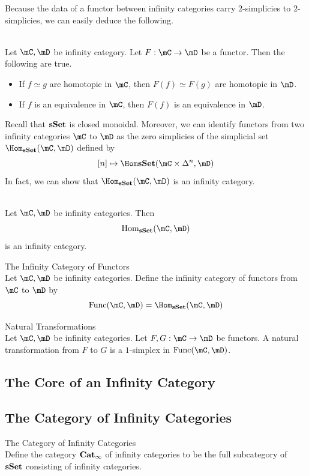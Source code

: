\documentclass[a4paper]{article}
\begin{document}
Because the data of a functor between infinity categories carry $2$-simplicies to $2$-simplicies, we can easily deduce the following. 

\begin{lmm}{}{}\\ Let $\mC,\mD$ be infinity category. Let $F:\mC\to\mD$ be a functor. Then the following are true. 
\begin{itemize}
\item If $f\simeq g$ are homotopic in $\mC$, then $F(f)\simeq F(g)$ are homotopic in $\mD$. 
\item If $f$ is an equivalence in $\mC$, then $F(f)$ is an equivalence in $\mD$. 
\end{itemize}
\end{lmm}

Recall that $\bold{sSet}$ is closed monoidal. Moreover, we can identify functors from two infinity categories $\mC$ to $\mD$ as the zero simplicies of the simplicial set $\Hom_\bold{sSet}(\mC,\mD)$ defined by $$[n]\mapsto\Hom\bold{sSet}(\mC\times\Delta^n,\mD)$$ In fact, we can show that $\Hom_\bold{sSet}(\mC,\mD)$ is an infinity category. 

\begin{prp}{}{}\\ Let $\mC,\mD$ be infinity categories. Then $$\text{Hom}_\bold{sSet}(\mC,\mD)$$ is an infinity category. 
\end{prp}

\begin{defn}{The Infinity Category of Functors}{}\\ Let $\mC,\mD$ be infinity categories. Define the infinity category of functors from $\mC$ to $\mD$ by $$\text{Func}(\mC,\mD)=\Hom_\bold{sSet}(\mC,\mD)$$
\end{defn}

\begin{defn}{Natural Transformations}{}\\
Let $\mC,\mD$ be infinity categories. Let $F,G:\mC\to\mD$ be functors. A natural transformation from $F$ to $G$ is a $1$-simplex in $\text{Func}(\mC,\mD)$. 
\end{defn}

\subsection{The Core of an Infinity Category}

\subsection{The Category of Infinity Categories}
\begin{defn}{The Category of Infinity Categories}{}\\ Define the category $\bold{Cat}_\infty$ of infinity categories to be the full subcategory of $\bold{sSet}$ consisting of infinity categories. 
\end{defn}
\end{document}
